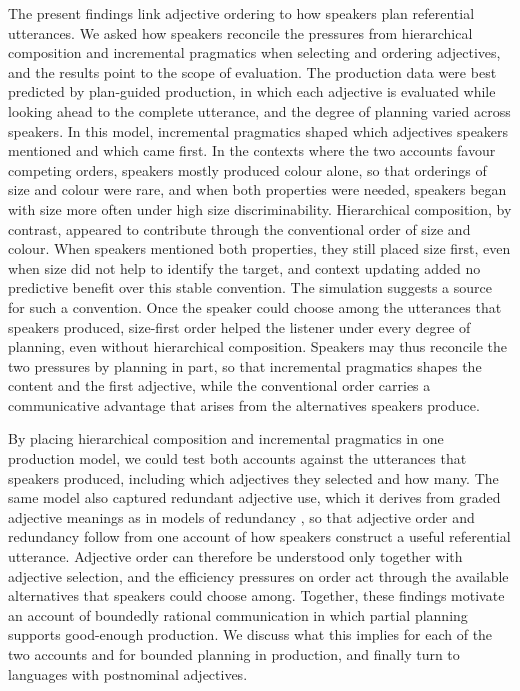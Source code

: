 \documentclass[10pt,a4paper,fleqn]{article}
\begin{document}
The present findings link adjective ordering to how speakers plan referential utterances.
We asked how speakers reconcile the pressures from hierarchical composition and incremental pragmatics when selecting and ordering adjectives, and the results point to the scope of evaluation.
The production data were best predicted by plan-guided production, in which each adjective is evaluated while looking ahead to the complete utterance, and the degree of planning varied across speakers.
In this model, incremental pragmatics shaped which adjectives speakers mentioned and which came first.
In the contexts where the two accounts favour competing orders, speakers mostly produced colour alone, so that orderings of size and colour were rare, and when both properties were needed, speakers began with size more often under high size discriminability.
Hierarchical composition, by contrast, appeared to contribute through the conventional order of size and colour.
When speakers mentioned both properties, they still placed size first, even when size did not help to identify the target, and context updating added no predictive benefit over this stable convention.
The simulation suggests a source for such a convention.
Once the speaker could choose among the utterances that speakers produced, size-first order helped the listener under every degree of planning, even without hierarchical composition.
Speakers may thus reconcile the two pressures by planning in part, so that incremental pragmatics shapes the content and the first adjective, while the conventional order carries a communicative advantage that arises from the alternatives speakers produce.

By placing hierarchical composition and incremental pragmatics in one production model, we could test both accounts against the utterances that speakers produced, including which adjectives they selected and how many.
The same model also captured redundant adjective use, which it derives from graded adjective meanings as in models of redundancy \citep{degen2020redundancy}, so that adjective order and redundancy follow from one account of how speakers construct a useful referential utterance.
Adjective order can therefore be understood only together with adjective selection, and the efficiency pressures on order act through the available alternatives that speakers could choose among.
Together, these findings motivate an account of boundedly rational communication in which partial planning supports good-enough production.
We discuss what this implies for each of the two accounts and for bounded planning in production, and finally turn to languages with postnominal adjectives.
\end{document}
